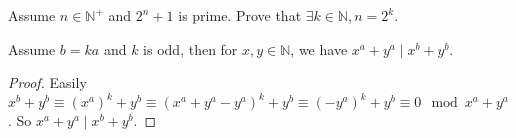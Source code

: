 \documentclass{ctexart}
\newif\ifpreface
\begin{document}
\large
\iffalse
  \setlength{\baselineskip}{1.2em}
  \ifpreface
    
  \else
    \maketitle
  \fi
\fi
{}

\begin{problem}\label{pro:p14.5}
  Assume \(n \in \mathbb{N}^+\) and \(2^n + 1\) is prime. Prove that \(\exists k \in \mathbb{N},n=2^k\).
\end{problem}
\begin{lemma}\label{lem:1}
  Assume \(b=ka\) and \(k\) is odd, then for \(x,y \in \mathbb{N}\), we have \(x^a + y^a \mid x^b + y^b\).
\end{lemma}
\begin{proof}
  Easily \(x^b + y^b \equiv (x^a)^k + y^b \equiv (x^a + y^a - y^a)^k + y^b \equiv (-y^a)^k + y^b \equiv 0 \mod x^a + y^a\).
  So \(x^a + y^a \mid x^b + y^b\).
\end{proof}
\end{document}
